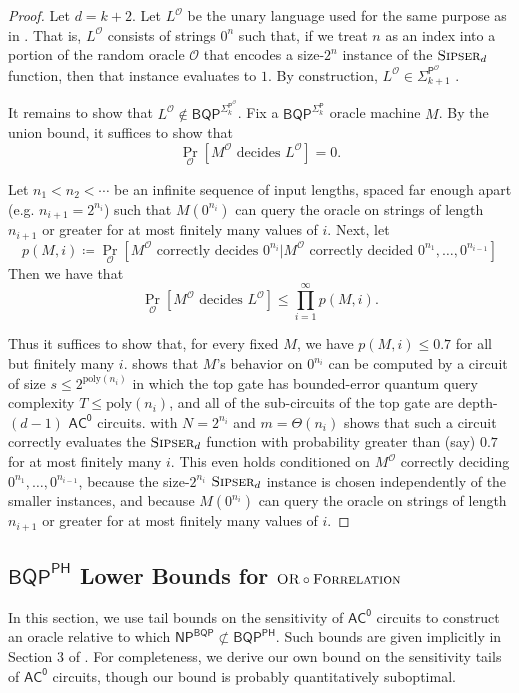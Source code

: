 \documentclass[10pt,a4paper]{article}
\newcommand{\poly}{\mathrm{poly}}
\newcommand{\Sipser}{\normalfont\textsc{Sipser}}
\newcommand{\OR}{\normalfont\textsc{OR}}
\newcommand{\Forrelation}{\normalfont\textsc{Forrelation}}
\begin{document}
\begin{proof}
Let $d = k + 2$. Let $L^\mathcal{O}$ be the unary language used for the same purpose as in \cite{RST15,HRST17}. That is, $L^\mathcal{O}$ consists of strings $0^n$ such that, if we treat $n$ as an index into a portion of the random oracle $\mathcal{O}$ that encodes a size-$2^n$ instance of the $\Sipser_{d}$ function, then that instance evaluates to $1$. By construction, $L^\mathcal{O} \in \mathsf{\Sigma}_{k+1}^{\mathsf{P}^\mathcal{O}}$ \cite{RST15,HRST17}.

It remains to show that $L^\mathcal{O} \not\in \mathsf{BQP}^{\mathsf{\Sigma}_k^{\mathsf{P}^\mathcal{O}}}$. Fix a $\mathsf{BQP}^{\mathsf{\Sigma}_k^{\mathsf{P}}}$ oracle machine $M$. By the union bound, it suffices to show that
\[
\Pr_{\mathcal{O}}\left[M^\mathcal{O} \text{ decides } L^\mathcal{O}\right]=0.
\]

Let $n_1<n_2<\cdots$ be an infinite sequence of input lengths, spaced far enough apart (e.g. $n_{i+1}=2^{n_i}$) such that $M\left(0^{n_i}\right)$ can query the oracle on strings of length $n_{i+1}$ or greater for at most finitely many values of $i$. Next, let
\[
p(M,i)\coloneqq\Pr_{\mathcal{O}}\left[M^\mathcal{O} \text{ correctly decides } 0^{n_i}|M^\mathcal{O} \text{ correctly decided }0^{n_1},\dots,0^{n_{i-1}}\right]
\]
Then we have that
\[
\Pr_{\mathcal{O}}\left[M^\mathcal{O}\text{ decides }L^\mathcal{O}\right]\leq\prod_{i=1}^\infty p(M,i).
\]

\noindent Thus it suffices to show that, for every fixed $M$, we have $p(M,i)\leq 0.7$ for all but finitely many $i$.  shows that $M$'s behavior on $0^{n_i}$ can be computed by a circuit of size $s \le 2^{\poly(n_i)}$ in which the top gate has bounded-error quantum query complexity $T \le \poly(n_i)$, and all of the sub-circuits of the top gate are depth-$(d-1)$ $\mathsf{AC^0}$ circuits.  with $N = 2^{n_i}$ and $m = \Theta(n_i)$ shows that such a circuit correctly evaluates the $\Sipser_d$ function with probability greater than (say) $0.7$ for at most finitely many $i$. This even holds conditioned on $M^\mathcal{O}$ correctly deciding $0^{n_1},\ldots,0^{n_{i-1}}$, because the size-$2^{n_i}$ $\Sipser_d$ instance is chosen independently of the smaller instances, and because $M\left(0^{n_i}\right)$ can query the oracle on strings of length $n_{i+1}$ or greater for at most finitely many values of $i$.
\end{proof}

\subsection{\texorpdfstring{$\mathsf{BQP}^{\mathsf{PH}}$}{BQP\^{}PH} Lower Bounds for \texorpdfstring{$\OR \circ \Forrelation$}{OR of FORRELATIONs}}
\label{sec:implications_of_ac0_concentration}
In this section, we use tail bounds on the sensitivity of $\mathsf{AC^0}$ circuits to construct an oracle relative to which $\mathsf{NP}^\mathsf{BQP} \not\subset \mathsf{BQP}^\mathsf{PH}$. Such bounds are given implicitly in Section 3 of \cite{GSTW16}. For completeness, we derive our own bound on the sensitivity tails of $\mathsf{AC^0}$ circuits, though our bound is probably quantitatively suboptimal.
\end{document}

